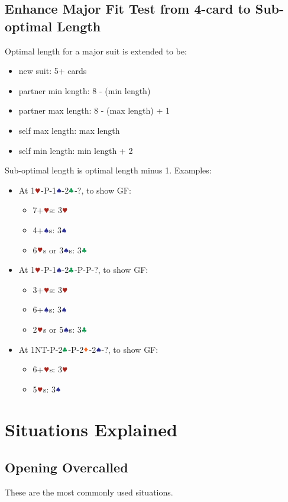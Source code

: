 \documentclass{article}
\begin{document}
\begin{multicols}{2}
\begin{CJK*}{UTF8}{gt}
\subsection{Enhance Major Fit Test from 4-card to Sub-optimal Length}
Optimal length for a major suit is extended to be:
\begin{itemize}
    \item new suit: 5+ cards
    \item partner min length: 8 - (min length)
    \item partner max length: 8 - (max length) + 1
    \item self max length: max length
    \item self min length: min length + 2
\end{itemize}
Sub-optimal length is optimal length minus 1. Examples:
\begin{itemize}
    \item At 1$\hhh$-P-1$\sss$-2$\ccc$-?, to show GF:
    \begin{itemize}
        \item 7+$\hhh$s: 3$\hhh$
        \item 4+$\sss$s: 3$\sss$
        \item 6$\hhh$s or 3$\sss$s: 3$\ccc$
    \end{itemize}
    \item At 1$\hhh$-P-1$\sss$-2$\ccc$-P-P-?, to show GF:
    \begin{itemize}
        \item 3+$\hhh$s: 3$\hhh$
        \item 6+$\sss$s: 3$\sss$
        \item 2$\hhh$s or 5$\sss$s: 3$\ccc$
    \end{itemize}
    \item At 1NT-P-2$\ccc$-P-2$\ddd$-2$\sss$-?, to show GF:
    \begin{itemize}
        \item 6+$\hhh$s: 3$\hhh$
        \item 5$\hhh$s: 3$\sss$
    \end{itemize}
\end{itemize}

\section{Situations Explained}
\subsection{Opening Overcalled}
These are the most commonly used situations.

\end{CJK*}
\end{multicols}
\end{document}
